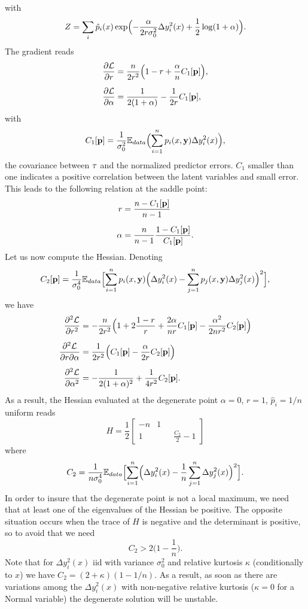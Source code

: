 \documentclass[envcountsect,runningheads]{llncs}
\theoremstyle{etoile}
\def\DD{\displaystyle}
\begin{document}
with
\[
Z = \sum_i \hat p_i(x)\exp\Bigl(-\frac{\alpha}{2r\sigma_0^2}\Delta y_i^2(x)+\frac{1}{2}\log(1+\alpha)\Bigr).
\]
The gradient reads
\begin{align*}
  \frac{\partial {\cal L}}{\partial r} &= \frac{n}{2r^2}\Bigl(1-r+\frac{\alpha}{n}C_1[{\bf p}]\Bigr),\\[0.2cm]
  \frac{\partial {\cal L}}{\partial \alpha} &= \frac{1}{2(1+\alpha)}-\frac{1}{2r}C_1[{\bf p}],  
\end{align*}
with
\[
C_1[{\bf p}] = \frac{1}{\sigma_0^2}{\mathbb E}_{data}\Bigl(\sum_{i=1}^n p_i(x,{\bf y})\Delta y_i^2(x)\Bigr),
\]
the covariance between ${\bf \tau}$ and the normalized predictor errors. $C_1$ smaller than one 
indicates a positive correlation between the latent variables and small error. 
This leads to the following relation at the saddle point:
\begin{align*}
  r &= \frac{n-C_1[{\bf p}]}{n-1}\\[0.2cm]
\alpha &= \frac{n}{n-1}\frac{1-C_1[{\bf p}]}{C_1[{\bf p}]}.
\end{align*}
Let us now compute the Hessian. Denoting
\[
C_2[{\bf p}] = \frac{1}{\sigma_0^4}{\mathbb E}_{data}\Bigl[\sum_{i=1}^n p_i(x,{\bf y})\Bigl(\Delta y_i^2(x)-\sum_{j=1}^np_j(x,{\bf y})\Delta y_j^2(x)\Bigr)^2\Bigr],
\]
we have
\begin{align*}
\frac{\partial^2 {\cal L}}{\partial r^2} &= -\frac{n}{2r^2}\Bigl(1+2\frac{1-r}{r}+\frac{2\alpha}{nr}C_1[{\bf p}]-\frac{\alpha^2}{2nr^2}C_2[{\bf p}]\Bigr)\\[0.2cm]
\frac{\partial^2 {\cal L}}{\partial r\partial \alpha} &=\frac{1}{2r^2}\Bigl(C_1[{\bf p}]-\frac{\alpha}{2r}C_2[{\bf p}]\Bigr)\\[0.2cm]
\frac{\partial^2 {\cal L}}{\partial \alpha^2} &= -\frac{1}{2(1+\alpha)^2}+\frac{1}{4r^2}C_2[{\bf p}]. 
\end{align*}
As a result, the Hessian evaluated at the degenerate point $\alpha=0$, $r=1$, $\hat  p_i=1/n$ uniform reads
\[
H =\frac{1}{2}
\left[
  \begin{matrix}
 -n & 1\\[0.4cm] 
 1 & \qquad\DD \frac{C_2}{2}-1
  \end{matrix}
  \right]
\]
where
\[
C_2 = \frac{1}{n\sigma_0^4}{\mathbb E}_{data}\Bigl[\sum_{i=1}^n \Bigl(\Delta y_i^2(x)-\frac{1}{n}\sum_{j=1}^n\Delta y_j^2(x)\Bigr)^2\Bigr].
\]
In order to insure that the degenerate point is not a local maximum, we need that at least one of the eigenvalues of the Hessian be positive.
The opposite situation occurs when the trace of $H$ is negative and the determinant is positive, so to avoid that we need
\[
C_2 > 2\bigl(1-\frac{1}{n}\bigr).
\]
Note that for $\Delta y_i^2(x)$ iid with variance $\sigma_0^2$ and relative kurtosis $\kappa$ (conditionally to $x$)
we have $C_2 = (2+\kappa)(1-1/n)$.
As a result, as soon as there are variations among the $\Delta y_i^2(x)$ with non-negative relative kurtosis ($\kappa=0$ for a Normal variable)
the  degenerate solution will be unstable.
\end{document}
